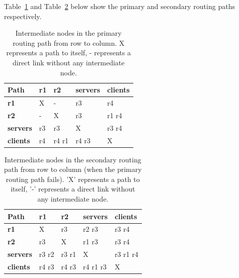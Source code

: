 \documentclass{article}
\begin{document}
Table~\ref{tab:primary_path} and Table~\ref{tab:secondary_path} below show the primary and secondary routing paths respectively.


\begin{table}[h!]
    \centering
    \begin{tabular}{|m{1.5cm}||m{2cm}|m{2cm}|m{2cm}|m{2cm}|}
        \hline
        \textbf{Path} & \textbf{r1} & \textbf{r2} & \textbf{servers} & \textbf{clients}\\ 
        \hline\hline
        \textbf{r1}         & X           & -           & r3             & r4\\
        \textbf{r2}         & -           & X           &r3               & r1 r4 \\ 
        \textbf{servers}    & r3           & r3           & X               & r3 r4 \\ 
        \textbf{clients}    & r4           & r4 r1          &r4 r3               & X \\ 
        \hline
    \end{tabular}
    \caption{Intermediate nodes in the primary routing path from row to column. X represents a path to itself, - represents a direct link without any intermediate node.}
    \label{tab:primary_path}
\end{table}

\begin{table}[h!]
    \centering
    \begin{tabular}{|m{1.5cm}||m{2cm}|m{2cm}|m{2cm}|m{2cm}|}
        \hline
        \textbf{Path} & \textbf{r1} & \textbf{r2} & \textbf{servers} & \textbf{clients}\\ 
        \hline\hline
        \textbf{r1}         & X           & r3          & r2 r3              & r3 r4 \\
        \textbf{r2}         & r3          & X           & r1 r3              & r3 r4 \\ 
        \textbf{servers}    & r3 r2          & r3 r1          & X               & r3 r1 r4 \\ 
        \textbf{clients}    & r4 r3          & r4 r3          & r4 r1 r3              & X \\ 
        \hline
    \end{tabular}
    \caption{Intermediate nodes in the secondary routing path from row to column (when the primary routing path fails). 'X' represents a path to itself, '-' represents a direct link without any intermediate node.}
    \label{tab:secondary_path}
\end{table}
\end{document}

